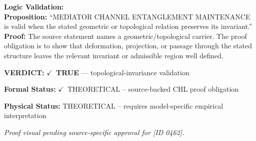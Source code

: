 \textbf{Logic Validation:}\\
\textbf{Proposition:} ``MEDIATOR CHANNEL ENTANGLEMENT MAINTENANCE is valid when the stated geometric or
topological relation preserves its invariant.''\\
\textbf{Proof:} The source statement names a geometric/topological carrier. The proof obligation is to
show that deformation, projection, or passage through the stated structure leaves the
relevant invariant or admissible region well defined.

\textbf{VERDICT:} \ensuremath{\checkmark}\ \textbf{TRUE} --- topological-invariance validation

\textbf{Formal Status:} \ensuremath{\checkmark}\ THEORETICAL -- source-backed CHL proof obligation

\textbf{Physical Status:} THEORETICAL -- requires model-specific empirical interpretation
\par\vspace{0.45em}
\par
\vfill
\begingroup\footnotesize\itshape
Proof visual pending source-specific approval for [ID 0462].
\par\endgroup
\vfill
\endgroup
\endgroup

